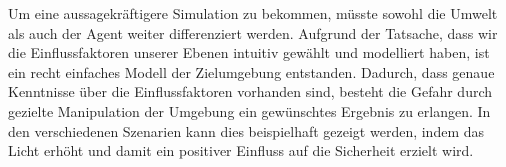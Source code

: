 \documentclass[10pt]{scrartcl}
\begin{document}
Um eine aussagekräftigere Simulation zu bekommen, müsste sowohl die Umwelt als auch der Agent weiter differenziert werden. Aufgrund der Tatsache, dass wir die Einflussfaktoren unserer Ebenen intuitiv gewählt und modelliert haben, ist ein recht einfaches Modell der Zielumgebung entstanden. Dadurch, dass genaue Kenntnisse über die Einflussfaktoren vorhanden sind, besteht die Gefahr durch gezielte Manipulation der Umgebung ein gewünschtes Ergebnis zu erlangen. In den verschiedenen Szenarien kann dies beispielhaft gezeigt werden, indem das Licht erhöht und damit ein positiver Einfluss auf die Sicherheit erzielt wird.
\end{document}
